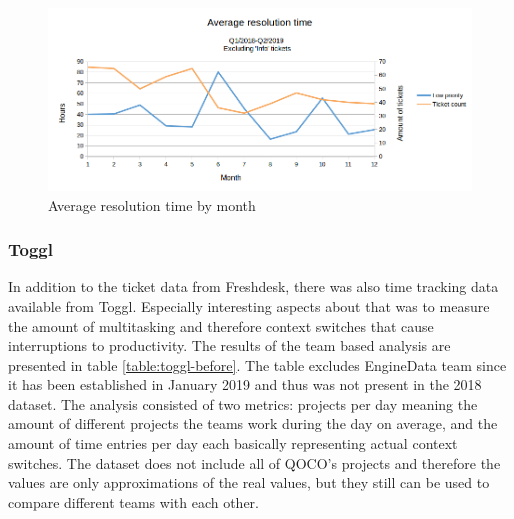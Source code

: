 \begin{figure}[ht]
  \begin{center}
    \includegraphics[width=1.0\textwidth]{images/resolution-time-before-2.png}
    \caption{Average resolution time by month}
    \label{fig:resolution-time-before}
  \end{center}
\end{figure}

\subsubsection*{Toggl}

In addition to the ticket data from Freshdesk, there was also time tracking data available from Toggl. Especially interesting aspects about that was to measure the amount of multitasking
and therefore context switches that cause interruptions to productivity. The results of the team based analysis are presented in table \ref{table:toggl-before}.
The table excludes EngineData team since it has been established in January 2019 and thus was not present in the 2018 dataset. The analysis consisted of two metrics: projects per day
meaning the amount of different projects the teams work during the day on average, and the amount of time entries per day each basically representing actual context switches. The dataset
does not include all of QOCO's projects and therefore the values are only approximations of the real values, but they still can be used to compare different teams with each other.

